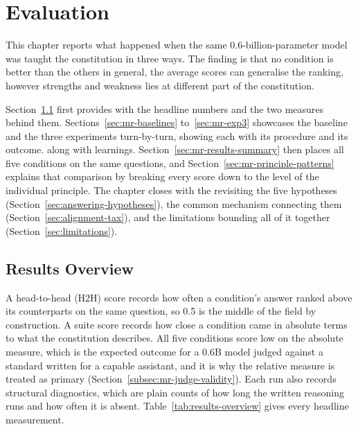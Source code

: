 \chapter{Evaluation}
\label{chap:Evaluation}
\label{chap:evaluation}
\label{chap:experiments-results}
\label{chap:discussion}

This chapter reports what happened when the same 0.6-billion-parameter model was taught the constitution in three ways. The finding is that no condition is better than the others in general, the average scores can generalise the ranking, however strengths and weakness lies at different part of the constitution.

Section~\ref{sec:mr-reading-results} first provides with the headline numbers and the two measures behind them. Sections~\ref{sec:mr-baselines} to~\ref{sec:mr-exp3} showcases the baseline and the three experiments turn-by-turn, showing each with its procedure and its outcome. along with learnings. Section~\ref{sec:mr-results-summary} then places all five conditions on the same questions, and Section~\ref{sec:mr-principle-patterns} explains that comparison by breaking every score down to the level of the individual principle. The chapter closes with the revisiting the five hypotheses (Section~\ref{sec:answering-hypotheses}), the common mechanism connecting them (Section~\ref{sec:alignment-tax}), and the limitations bounding all of it together (Section~\ref{sec:limitations}).

\section{Results Overview}
\label{sec:mr-reading-results}

A head-to-head (H2H) score records how often a condition's answer ranked above its counterparts on the same question, so 0.5 is the middle of the field by construction. A suite score records how close a condition came in absolute terms to what the constitution describes. All five conditions score low on the absolute measure, which is the expected outcome for a 0.6B model judged against a standard written for a capable assistant, and it is why the relative measure is treated as primary (Section~\ref{subsec:mr-judge-validity}). Each run also records structural diagnostics, which are plain counts of how long the written reasoning runs and how often it is absent. Table~\ref{tab:results-overview} gives every headline measurement.

